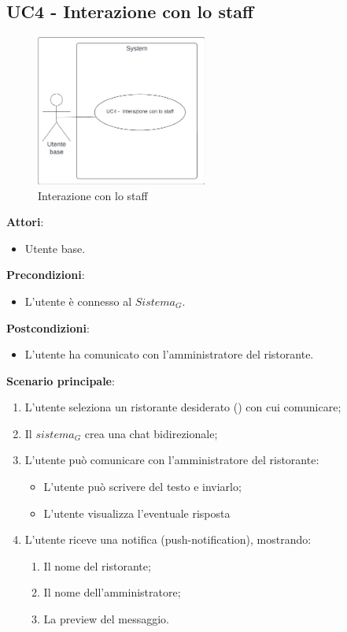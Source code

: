 \subsection{UC4 - Interazione con lo staff}\label{usecase:4}
\begin{figure}[H]
  \centering
  \includegraphics[width=0.5\textwidth]{ucd/UCD4.png}
  \caption{Interazione con lo staff}
\end{figure}
\textbf{Attori}:
\begin{itemize}
    \item Utente base.
\end{itemize}
\textbf{Precondizioni}:
\begin{itemize}
    \item L'utente è connesso al $\textit{Sistema}_G$.
\end{itemize}
\textbf{Postcondizioni}:
\begin{itemize}
    \item L'utente ha comunicato con l'amministratore del ristorante.
\end{itemize}
\textbf{Scenario principale}:
\begin{enumerate}
    \item L'utente seleziona un ristorante desiderato () con cui comunicare;
    \item Il $\textit{sistema}_G$ crea una chat bidirezionale;
    \item L'utente può comunicare con l'amministratore del ristorante:
    \begin{itemize}
        \item L'utente può scrivere del testo e inviarlo;
        \item L'utente visualizza l'eventuale risposta
    \end{itemize}
    \item L'utente riceve una notifica (push-notification), mostrando:
    \begin{enumerate}
        \item Il nome del ristorante;
        \item Il nome dell'amministratore;
        \item La preview del messaggio.
    \end{enumerate}
\end{enumerate}
